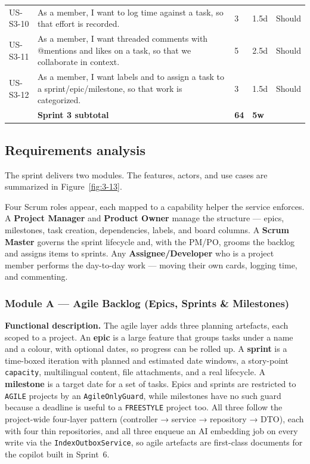 \begin{longtable}{@{}l>{\raggedright\arraybackslash}p{}lll@{}}
US-S3-10 & As a member, I want to log time against a task, so that effort is recorded. & 3 & 1.5d & Should \\
\rowcolor{rowalt}
US-S3-11 & As a member, I want threaded comments with @mentions and likes on a task, so that we collaborate in context. & 5 & 2.5d & Should \\
US-S3-12 & As a member, I want labels and to assign a task to a sprint/epic/milestone, so that work is categorized. & 3 & 1.5d & Should \\
\midrule
 & \textbf{Sprint 3 subtotal} & \textbf{64} & \textbf{5w} & \\
\end{longtable}

\subsection{Requirements analysis}

The sprint delivers two modules. The features, actors, and use cases are summarized in
Figure~\ref{fig:3-13}.

{\renewcommand{\figmaxheight}{0.75\textheight}%
}

Four Scrum roles appear, each mapped to a capability helper the service enforces. A
\textbf{Project Manager} and \textbf{Product Owner} manage the structure --- epics, milestones,
task creation, dependencies, labels, and board columns. A \textbf{Scrum Master} governs the sprint
lifecycle and, with the PM/PO, grooms the backlog and assigns items to sprints. Any
\textbf{Assignee/Developer} who is a project member performs the day-to-day work --- moving their
own cards, logging time, and commenting.

\subsubsection{Module A --- Agile Backlog (Epics, Sprints \& Milestones)}

\textbf{Functional description.} The agile layer adds three planning artefacts, each scoped to a
project. An \textbf{epic} is a large feature that groups tasks under a name and a colour, with
optional dates, so progress can be rolled up. A \textbf{sprint} is a time-boxed iteration with
planned and estimated date windows, a story-point \texttt{capacity}, multilingual content, file
attachments, and a real lifecycle. A \textbf{milestone} is a target date for a set of tasks.
Epics and sprints are restricted to \texttt{AGILE} projects by an \texttt{AgileOnlyGuard}, while
milestones have no such guard because a deadline is useful to a \texttt{FREESTYLE} project too.
All three follow the project-wide four-layer pattern (controller → service → repository → DTO),
each with four thin repositories, and all three enqueue an AI embedding job on every write via
the \texttt{IndexOutboxService}, so agile artefacts are first-class documents for the copilot
built in Sprint~6.

